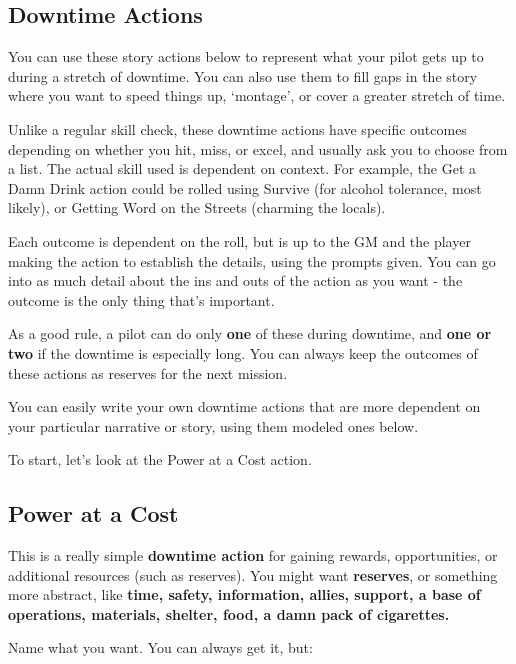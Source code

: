 \subsection{Downtime Actions}

You can use these story actions below to represent what your pilot gets up to during a stretch of downtime. You can also use them to fill gaps in the story where you want to speed things up, ‘montage’, or cover a greater stretch of time. 

Unlike a regular skill check, these downtime actions have specific outcomes depending on whether you hit, miss, or excel, and usually ask you to choose from a list. The actual skill used is dependent on context. For example, the Get a Damn Drink action could be rolled using Survive (for alcohol tolerance, most likely), or Getting Word on the Streets (charming the locals). 

Each outcome is dependent on the roll, but is up to the GM and the player making the action to establish the details, using the prompts given. You can go into as much detail about the ins and outs of the action as you want - the outcome is the only thing that’s important.

As a good rule, a pilot can do only \textbf{one} of these during downtime, and \textbf{one or two} if the downtime is especially long. You can always keep the outcomes of these actions as reserves for the next mission.

You can easily write your own downtime actions that are more dependent on your particular narrative or story, using them modeled ones below.

To start, let’s look at the Power at a Cost action.

\subsection{Power at a Cost}

This is a really simple \textbf{downtime action} for gaining rewards, opportunities, or additional resources (such as reserves). You might want \textbf{reserves}, or something more abstract, like \textbf{time, safety, information, allies, support, a base of operations, materials, shelter, food, a damn pack of cigarettes.} 

Name what you want. You can always get it, but:

